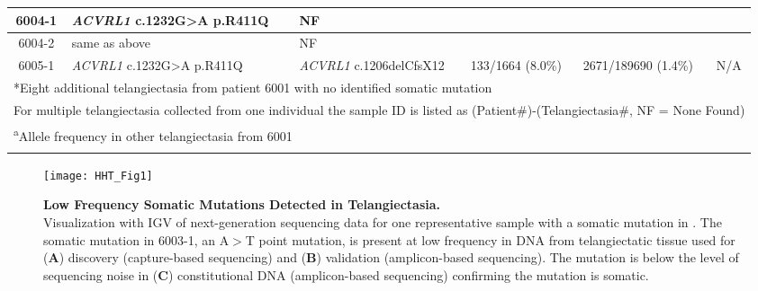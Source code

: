 \begin{sidewaystable}[]
\begin{tabularx}{\textheight}{c p{3.5cm} p{3.5cm} XXX}
6004-1 & \textit{ACVRL1} \newline c.1232G\textgreater{}A p.R411Q & NF &	 & & \\\hline
6004-2 & same as above & NF & & & \\\hline
6005-1 & \textit{ACVRL1} \newline c.1232G\textgreater{}A p.R411Q & \textit{ACVRL1} \newline c.1206delCfsX12 & 133/1664 (8.0\%) & 2671/189690 (1.4\%) & N/A \\
\bottomrule
\multicolumn{6}{l}{*Eight additional telangiectasia from patient 6001 with no identified somatic mutation} \\
\multicolumn{6}{l}{For multiple telangiectasia collected from one individual the sample ID is listed as (Patient\#)-(Telangiectasia\#, NF = None Found)} \\
\multicolumn{6}{l}{\textsuperscript{a}Allele frequency in other telangiectasia from 6001} \\
\label{HHT_Table_1}
\end{tabularx}

\end{sidewaystable}



\begin{figure}[tbp!]
\begin{center}
\texttt{[image: HHT\_Fig1]}
\end{center}
\caption[Low Frequency Somatic Mutations Detected in Telangiectasia.] {\textbf{Low Frequency Somatic Mutations Detected in Telangiectasia.}\\ Visualization with IGV of next-generation sequencing data for one representative sample with a somatic mutation in . The somatic mutation in 6003-1, an A$>$T point mutation, is present at low frequency in DNA from telangiectatic tissue used for (\textbf{A}) discovery (capture-based sequencing) and (\textbf{B}) validation (amplicon-based sequencing). The mutation is below the level of sequencing noise in (\textbf{C}) constitutional DNA (amplicon-based sequencing) confirming the mutation is somatic.}

\label{HHT_Figure_1}
\end{figure}

